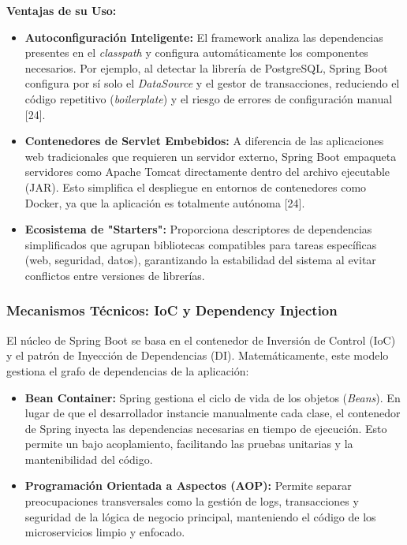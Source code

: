 \textbf{Ventajas de su Uso:}
\begin{itemize}
    \item \textbf{Autoconfiguración Inteligente:} El framework analiza las dependencias presentes en el \textit{classpath} y configura automáticamente los componentes necesarios. Por ejemplo, al detectar la librería de PostgreSQL, Spring Boot configura por sí solo el \textit{DataSource} y el gestor de transacciones, reduciendo el código repetitivo (\textit{boilerplate}) y el riesgo de errores de configuración manual [24].
    
    \item \textbf{Contenedores de Servlet Embebidos:} A diferencia de las aplicaciones web tradicionales que requieren un servidor externo, Spring Boot empaqueta servidores como Apache Tomcat directamente dentro del archivo ejecutable (JAR). Esto simplifica el despliegue en entornos de contenedores como Docker, ya que la aplicación es totalmente autónoma [24].
    
    \item \textbf{Ecosistema de "Starters":} Proporciona descriptores de dependencias simplificados que agrupan bibliotecas compatibles para tareas específicas (web, seguridad, datos), garantizando la estabilidad del sistema al evitar conflictos entre versiones de librerías.
\end{itemize}

\subsubsection{Mecanismos Técnicos: IoC y Dependency Injection}

El núcleo de Spring Boot se basa en el contenedor de Inversión de Control (IoC) y el patrón de Inyección de Dependencias (DI). Matemáticamente, este modelo gestiona el grafo de dependencias de la aplicación:
\begin{itemize}
    \item \textbf{Bean Container:} Spring gestiona el ciclo de vida de los objetos (\textit{Beans}). En lugar de que el desarrollador instancie manualmente cada clase, el contenedor de Spring inyecta las dependencias necesarias en tiempo de ejecución. Esto permite un bajo acoplamiento, facilitando las pruebas unitarias y la mantenibilidad del código.
    \item \textbf{Programación Orientada a Aspectos (AOP):} Permite separar preocupaciones transversales como la gestión de logs, transacciones y seguridad de la lógica de negocio principal, manteniendo el código de los microservicios limpio y enfocado.
\end{itemize}

